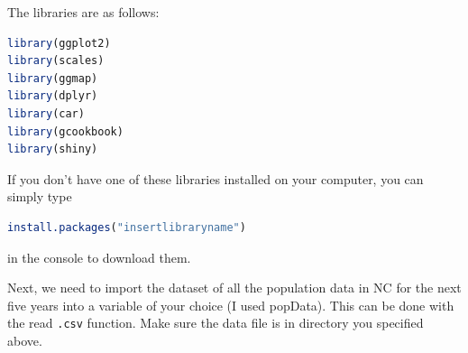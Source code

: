 \noindent The libraries are as follows:

\begin{lstlisting}[language = R]
library(ggplot2)
library(scales)
library(ggmap)
library(dplyr)
library(car)
library(gcookbook)
library(shiny)
\end{lstlisting}


\noindent If you don't have one of these libraries installed on your computer, you can simply type 
\begin{lstlisting}[language = R]
install.packages("insertlibraryname") 
\end{lstlisting}
in the console to download them. 

\noindent Next, we need to import the dataset of all the population data in NC for the next five years into a variable of your choice (I used popData).
This can be done with the read \texttt{.csv} function.
Make sure the data file is in directory you specified above. 

